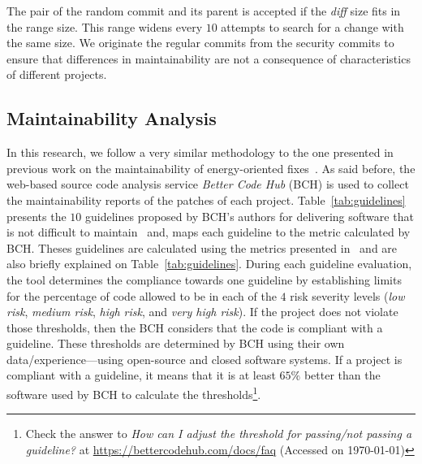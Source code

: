 \documentclass[smallextended]{svjour3}       %
\begin{document}
The pair of the random commit and its parent is accepted if the 
\emph{diff} size fits in the range size. This range widens every 
$10$ attempts to search for a change with the same size. We 
originate the regular commits from the security commits to ensure 
that differences in maintainability are not a consequence of 
characteristics of different projects.

\subsection{Maintainability Analysis}



In this research, we follow a very similar methodology to the one 
presented in previous work on the maintainability of energy-oriented 
fixes~\cite{8919169}. As said before, the web-based source code 
analysis service \emph{Better Code Hub} (BCH) is used to collect the 
maintainability reports of the patches of each project. 
Table~\ref{tab:guidelines} presents the $10$ guidelines proposed
by BCH's authors for delivering software that is not difficult to
maintain~\cite{Visser:2016:OREILLY} and, maps each guideline to the 
metric calculated by BCH. Theses guidelines are calculated using the 
metrics presented in~\cite{criteria:2017} and are also briefly 
explained on Table~\ref{tab:guidelines}. 
During each guideline evaluation, the tool determines the compliance 
towards one guideline by establishing limits for the percentage of 
code allowed to be in each of the $4$ risk severity levels
(\emph{low risk}, \emph{medium risk}, \emph{high risk}, and 
\emph{very high risk}). If the project does not violate those 
thresholds, then the BCH considers that the code is compliant with 
a guideline. These thresholds are determined by BCH using their own
data/experience---using open-source and closed software systems. If 
a project is compliant with a guideline, it means that it is at 
least $65\%$ better than the software used by BCH to calculate the 
thresholds\footnote{Check the answer to \emph{How can I adjust the 
threshold for passing/not passing a guideline?} at
\url{https://bettercodehub.com/docs/faq} (Accessed on \today{})}.
\end{document}
